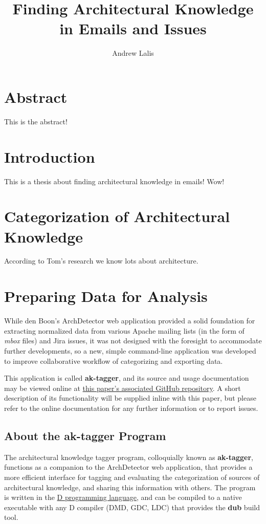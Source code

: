 \documentclass{article}
\title{Finding Architectural Knowledge in Emails and Issues}
\author{Andrew Lalis}
\begin{document}
\maketitle
\section{Abstract}
	This is the abstract!

\newpage

\tableofcontents

\section{Introduction}
	This is a thesis about finding architectural knowledge in emails! Wow!

\section{Categorization of Architectural Knowledge}
	According to Tom's research \cite{denBoon21} we know lots about architecture.

\section{Preparing Data for Analysis}
	While den Boon's ArchDetector web application provided a solid foundation for extracting normalized data from various Apache mailing lists (in the form of \textit{mbox} files) and Jira issues\cite{denBoon21}, it was not designed with the foresight to accommodate further developments, so a new, simple command-line application was developed to improve collaborative workflow of categorizing and exporting data.
	
	This application is called \textbf{ak-tagger}, and its source and usage documentation may be viewed online at \href{https://github.com/andrewlalis/ArchitecturalKnowledgeResearch}{this paper's associated GitHub repository}. A short description of its functionality will be supplied inline with this paper, but please refer to the online documentation for any further information or to report issues.
	
	\subsection{About the ak-tagger Program}
		The architectural knowledge tagger program, colloquially known as \textbf{ak-tagger}, functions as a companion to the ArchDetector web application, that provides a more efficient interface for tagging and evaluating the categorization of sources of architectural knowledge, and sharing this information with others. The program is written in the \href{https://dlang.org/}{D programming language}, and can be compiled to a native executable with any D compiler (DMD, GDC, LDC) that provides the \textbf{dub} build tool.
		
\end{document}

